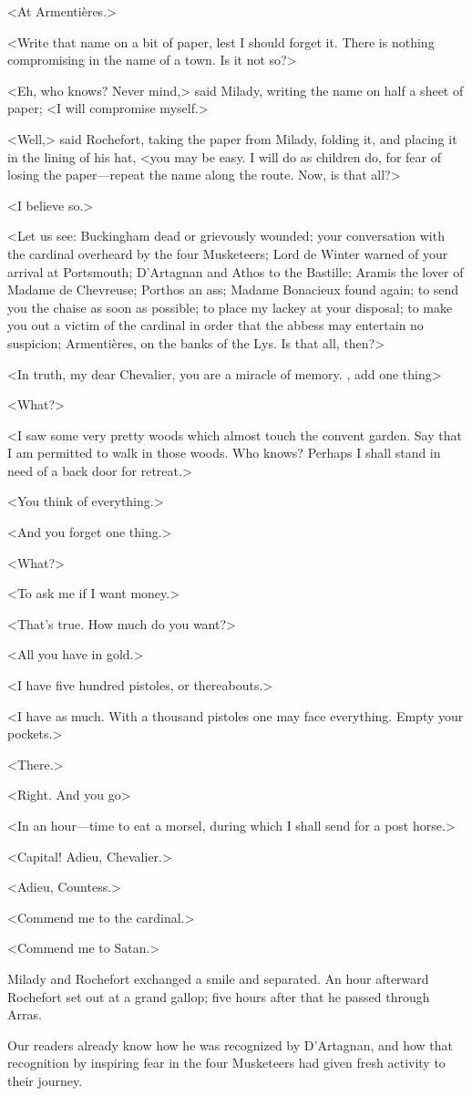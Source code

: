 <At Armentières.> 

<Write that name on a bit of paper, lest I should forget it. There is nothing compromising in the name of a town. Is it not so?> 

<Eh, who knows? Never mind,> said Milady, writing the name on half a sheet of paper; <I will compromise myself.> 

<Well,> said Rochefort, taking the paper from Milady, folding it, and placing it in the lining of his hat, <you may be easy. I will do as children do, for fear of losing the paper—repeat the name along the route. Now, is that all?> 

<I believe so.> 

<Let us see: Buckingham dead or grievously wounded; your conversation with the cardinal overheard by the four Musketeers; Lord de Winter warned of your arrival at Portsmouth; D'Artagnan and Athos to the Bastille; Aramis the lover of Madame de Chevreuse; Porthos an ass; Madame Bonacieux found again; to send you the chaise as soon as possible; to place my lackey at your disposal; to make you out a victim of the cardinal in order that the abbess may entertain no suspicion; Armentières, on the banks of the Lys. Is that all, then?> 

<In truth, my dear Chevalier, you are a miracle of memory. , add one thing\longdash> 

<What?> 

<I saw some very pretty woods which almost touch the convent garden. Say that I am permitted to walk in those woods. Who knows? Perhaps I shall stand in need of a back door for retreat.> 

<You think of everything.> 

<And you forget one thing.> 

<What?> 

<To ask me if I want money.> 

<That's true. How much do you want?> 

<All you have in gold.> 

<I have five hundred pistoles, or thereabouts.> 

<I have as much. With a thousand pistoles one may face everything. Empty your pockets.> 

<There.> 

<Right. And you go\longdash> 

<In an hour—time to eat a morsel, during which I shall send for a post horse.> 

<Capital! Adieu, Chevalier.> 

<Adieu, Countess.> 

<Commend me to the cardinal.> 

<Commend me to Satan.> 

Milady and Rochefort exchanged a smile and separated. An hour afterward Rochefort set out at a grand gallop; five hours after that he passed through Arras. 

Our readers already know how he was recognized by D'Artagnan, and how that recognition by inspiring fear in the four Musketeers had given fresh activity to their journey.